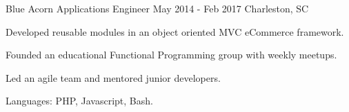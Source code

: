 \begin{cventries}
  \cventry
    {Blue Acorn} %
    {Applications Engineer} %
    {May 2014 - Feb 2017} %
    {Charleston, SC} %
    {
      \begin{cvitems} %
        \item {Developed reusable modules in an object oriented MVC eCommerce framework.}
        \item {Founded an educational Functional Programming group with weekly meetups.}
        \item {Led an agile team and mentored junior developers.}
        \item {Languages: PHP, Javascript, Bash.}
      \end{cvitems}
    }

\end{cventries}
